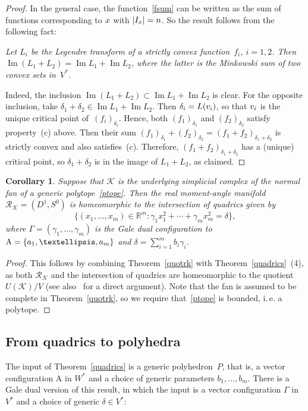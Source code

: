 \documentclass[a4paper]{amsart}
\newtheorem{corollary}[theorem]{Corollary}
\theoremstyle{definition}
\theoremstyle{remark}
\numberwithin{equation}{section}
\def\R{\mathbb R}
\def\R{\mathbb R}
\def\sK{\mathcal K}
\newcommand{\mb}[1]{{\textbf {\textit#1}}}
\def\Im{\mathop{\mathrm{Im}}}
\def\rk{\mathcal R_{\mathcal K}}
\newcommand{\<}{\langle}
\renewcommand{\>}{\rangle}
\begin{document}
\begin{proof}
In the general case, the function~\eqref{fsum} can be written as the sum of functions corresponding to $\mb x$ with $|I_{\mb x}|=n$. So the result follows from the following fact:

\smallskip

\noindent\textit{Let $L_i$ be the Legendre transform of a strictly convex function~$f_i$, $i=1,2$. Then 
$\Im(L_1+L_2)=\Im L_1+\Im L_2$, where the latter is the Minkowski sum of two convex sets in~$V^*$.}

\smallskip

\noindent Indeed, the inclusion $\Im(L_1+L_2)\subset\Im L_1+\Im L_2$ is clear. For the opposite inclusion, take $\delta_1+\delta_2\in\Im L_1+\Im L_2$. Then $\delta_i=L(\mb v_i)$, so that $\mb v_i$ is the unique critical point of~$(f_i)_{\delta_i}$. Hence, both 
$(f_1)_{\delta_1}$ and $(f_2)_{\delta_2}$ satisfy property~(c) above. Then their sum 
$(f_1)_{\delta_1}+(f_2)_{\delta_2}=(f_1+f_2)_{\delta_1+\delta_2}$ is strictly convex and also satisfies~(c). Therefore, $(f_1+f_2)_{\delta_1+\delta_2}$ has a (unique) critical point, so $\delta_1+\delta_2$ is in the image of $L_1+L_2$, as claimed.
\end{proof}

\begin{corollary}\label{rkquad}
Suppose that $\sK$ is the underlying simplicial complex of the normal fan of a generic polytope~\eqref{ptope}. Then the real moment-angle manifold $\rk=(D^1,S^0)$ is homeomorphic to the
intersection of quadrics given by
\[
  \{(x_1,\ldots,x_m)\in\R^m\colon\gamma_1 x^2_1+ 
  \cdots+\gamma_mx^2_m=\delta\},
\] 
where $\Gamma=(\gamma_1,\ldots,\gamma_m)$ is the Gale dual configuration to $\mathrm A=\{\mb a_1,\ldots,\mb a_m\}$ and $\delta=\sum_{i=1}^m b_i\gamma_i$.
\end{corollary}

\begin{proof}
This follows by combining Theorem~\ref{quotrk} with Theorem~\ref{quadrics}~(4), as both 
$\rk$ and the intersection of quadrics are homeomorphic to the quotient $U(\sK)/V$ (see also~\cite[Theorem~6.2.4]{bu-pa15} for a direct argument). Note that the fan is assumed to be complete in Theorem~\ref{quotrk}, so we require that~\eqref{ptope} is bounded, i.\,e. a polytope. 
\end{proof}




\subsection{From quadrics to polyhedra}
The input of Theorem~\ref{quadrics} is a generic polyhedron~$P$, that is, a vector configuration $\mathrm A$ in $W^*$ and a choice of generic parameters $b_1,\ldots,b_m$. There is a Gale dual version of this result, in which the input is a vector configuration $\Gamma$ in $V^*$ and a choice of generic $\delta\in V^*$:
\end{document}
